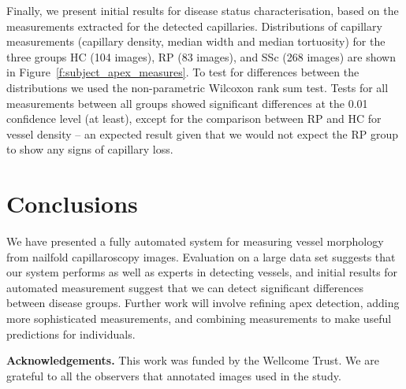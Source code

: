 \documentclass[runningheads,a4paper]{llncs}
\newcommand{\fref}[1]{Figure~\ref{#1}}
\begin{document}
Finally, we present initial results for disease status characterisation, based on the measurements extracted for the detected capillaries. Distributions of capillary measurements (capillary density, median width and median tortuosity) for the three groups HC (104 images), RP (83 images), and SSc (268 images) are shown in \fref{f:subject_apex_measures}. To test for differences between the distributions we used the non-parametric Wilcoxon rank sum test. Tests for all measurements between all groups showed significant differences at the 0.01 confidence level (at least), except for the comparison between RP and HC for vessel density -- an expected result given that we would not expect the RP group to show any signs of capillary loss.

\section{Conclusions}
\label{s:conclusions}
We have presented a fully automated system for measuring vessel morphology from nailfold capillaroscopy images. Evaluation on a large data set suggests that our system performs as well as experts in detecting vessels, and initial results for automated measurement suggest that we can detect significant differences between disease groups. Further work will involve refining apex detection, adding more sophisticated measurements, and combining measurements to make useful predictions for individuals.

\textbf{Acknowledgements.}
This work was funded by the Wellcome Trust. We are grateful to all the observers that annotated images used in the study.



\end{document}
